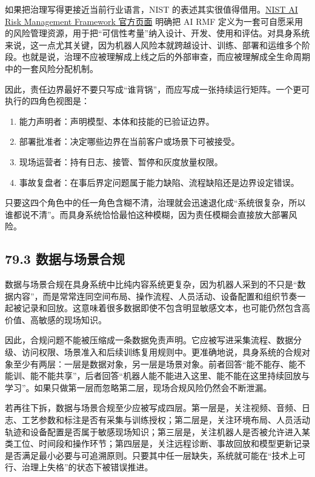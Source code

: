 如果把治理写得更接近当前行业语言，NIST 的表述其实很值得借用。\href{https://www.nist.gov/itl/ai-risk-management-framework}{NIST AI Risk Management Framework 官方页面} 明确把 AI RMF 定义为一套可自愿采用的风险管理资源，用于把“可信性考量”纳入设计、开发、使用和评估。对具身系统来说，这一点尤其关键，因为机器人风险本就跨越设计、训练、部署和运维多个阶段。也就是说，治理不应被理解成上线之后的外部审查，而应被理解成全生命周期中的一套风险分配机制。

因此，责任边界最好不要只写成“谁背锅”，而应写成一张持续运行矩阵。一个更可执行的四角色视图是：

\begin{enumerate}
\item 能力声明者：声明模型、本体和技能的已验证边界。
\item 部署批准者：决定哪些边界在当前客户或场景下可被接受。
\item 现场运营者：持有日志、接管、暂停和灰度放量权限。
\item 事故复盘者：在事后界定问题属于能力缺陷、流程缺陷还是边界设定错误。
\end{enumerate}

只要这四个角色中的任一角色含糊不清，治理就会迅速退化成“系统很复杂，所以谁都说不清”。而具身系统恰恰最怕这种模糊，因为责任模糊会直接放大部署风险。

\subsection*{79.3 数据与场景合规}


数据与场景合规在具身系统中比纯内容系统更复杂，因为机器人采到的不只是“数据内容”，而是常常连同空间布局、操作流程、人员活动、设备配置和组织节奏一起被记录和回放。这意味着很多数据即使不包含明显敏感文本，也可能仍然包含高价值、高敏感的现场知识。

因此，合规问题不能被压缩成一条数据免责声明。它应被写进采集流程、数据分级、访问权限、场景准入和后续训练复用规则中。更准确地说，具身系统的合规对象至少有两层：一层是数据对象，另一层是场景对象。前者回答“能不能存、能不能训、能不能共享”，后者回答“机器人能不能进入这里、能不能在这里持续回放与学习”。如果只做第一层而忽略第二层，现场合规风险仍然会不断泄漏。

若再往下拆，数据与场景合规至少应被写成四层。第一层是\texttt{}，关注视频、音频、日志、工艺参数和标注是否有采集与训练授权；第二层是\texttt{}，关注环境布局、人员活动轨迹和设备配置是否属于敏感现场知识；第三层是\texttt{}，关注机器人是否被允许进入某类工位、时间段和操作环节；第四层是\texttt{}，关注远程诊断、事故回放和模型更新记录是否满足最小必要与可追溯原则。只要其中任一层缺失，系统就可能在“技术上可行、治理上失格”的状态下被错误推进。

